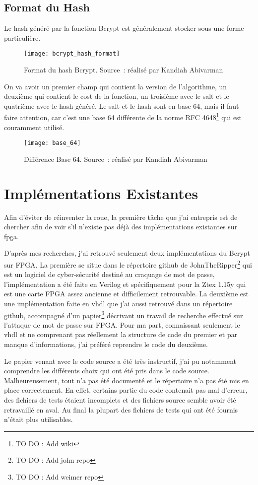 \subsection{Format du Hash}

Le hash généré par la fonction Bcrypt est généralement stocker sous une forme particulière. 

\begin{figure}[tbph!]
	\centering
	\texttt{[image: bcrypt\_hash\_format]}
	\caption[Format du hash Bcrypt]{Format du hash Bcrypt. Source : réalisé par Kandiah Abivarman}
	\label{fig:bcrypt_hash_format}
\end{figure}

On va avoir un premier champ qui contient la version de l'algorithme, un deuxième qui contient le cost de la fonction, un troisième avec le salt et le quatrième avec le hash généré. 
Le salt et le hash sont en base 64, mais il faut faire attention, car c'est une base 64 différente de la norme RFC 4648\footnote{TO DO : Add wiki} qui est couramment utilisé.

\begin{figure}[tbph!]
	\centering
	\texttt{[image: base\_64]}
	\caption[Différence Base 64]{Différence Base 64. Source : réalisé par Kandiah Abivarman}
	\label{fig:base_64}
\end{figure}

\section{Implémentations Existantes}

Afin d'éviter de réinventer la roue, la première tâche que j'ai entrepris est de chercher afin de voir s'il n'existe pas déjà des implémentations existantes sur \gls{fpga}. 

D'après mes recherches, j'ai retrouvé seulement deux implémentations du Bcrypt sur FPGA. La première se situe dans le répertoire github de JohnTheRipper\footnote{TO DO : Add john repo} qui est un logiciel de cyber-sécurité destiné au craquage de mot de passe, l'implémentation a été faite en Verilog et spécifiquement pour la Ztex 1.15y qui est une carte FPGA assez ancienne et difficilement retrouvable. 
La deuxième est une implémentation faite en \gls{vhdl} que j'ai aussi retrouvé dans un répertoire github, accompagné d'un papier\footnote{TO DO : Add weimer repo} décrivant un travail de recherche effectué sur l'attaque de mot de passe sur FPGA. 
Pour ma part, connaissant seulement le \gls{vhdl} et ne comprenant pas réellement la structure de code du premier et par manque d'informations, j'ai préféré reprendre le code du deuxième. 

Le papier venant avec le code source a été très instructif, j'ai pu notamment comprendre les différents choix qui ont été pris dans le code source. 
Malheureusement, tout n'a pas été documenté et le répertoire n'a pas été mis en place correctement. 
En effet, certains partie du code contenait pas mal d'erreur, des fichiers de tests étaient incomplets et des fichiers source semble avoir été retravaillé en aval.
Au final la plupart des fichiers de tests qui ont été fournis n'était plus utilisables.